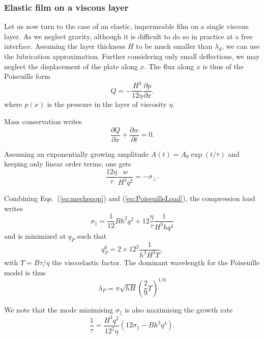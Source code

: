 \documentclass[twocolumn,superscriptaddress,showpacs,preprintnumbers,
amsmath,amssymb,prl]{revtex4-1}
\begin{document}
\subsubsection*{Elastic film on a viscous layer}
Let us now turn to the case of an elastic, impermeable film on a single viscous layer. As \cite{Huang2002} we neglect gravity, although it is difficult to do so in practice at a free interface. Assuming the layer thickness $H$ to be much smaller than $\lambda_d$, we can use the lubrication approximation. Further considering only small deflections, we may neglect the displacement of the plate along $x$. The flux along $x$ is thus of the Poiseuille form
\begin{equation}
Q = -\frac{H^3}{12\eta}\frac{\partial p}{\partial x}.
\label{eq:PoiseuilleFlux}
\end{equation}
where $p(x)$ is the pressure in the layer of viscosity $\eta$.

Mass conservation writes
\begin{equation}
\frac{\partial Q}{\partial x} + \frac{\partial w}{\partial t} = 0.
\label{eq:conservation}
\end{equation}

Assuming an exponentially growing amplitude $A(t) = A_0 \exp(t/\tau)$ and keeping only linear order terms, one gets
\begin{equation}
\frac{12\eta}{\tau} \frac{w}{H^3q^2} = -\sigma_\perp.
\label{eq:PoiseuilleLoad}
\end{equation}

Combining Eqs.~(\ref{eq:mecheqop}) and (\ref{eq:PoiseuilleLoad}), the compression load writes
\begin{equation}
\sigma_\parallel = \frac{1}{12}B h^2 q^2 + 12\frac{\eta}{\tau}\frac{1}{H^3 h q^4}
\label{eq:sigma0P}
\end{equation}
and is minimized at $q_P$ such that
\begin{equation}
q_P^6 = 2\times 12^2 \frac{1}{h^3H^3\Upsilon},
\label{eq:qP}
\end{equation}
with $\Upsilon = B\tau/\eta$ the viscoelastic factor. The dominant wavelength for the Poiseuille model is thus
\begin{equation}
\lambda_P = \pi\sqrt{hH}\left(\frac{2}{9}\Upsilon\right)^{1/6}
\end{equation}

We note that the mode minimising $\sigma_\parallel$ is also maximising the growth rate
\begin{equation}
\frac{1}{\tau} = \frac{H^3q^2}{12^2\eta}\left(12\sigma_\parallel - Bh^3q^4\right).
\end{equation}
\end{document}
